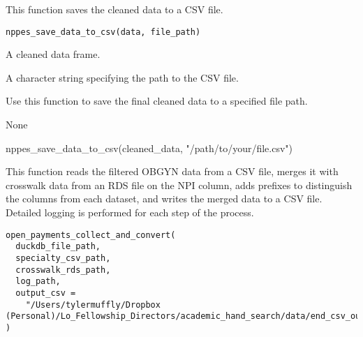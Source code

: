 \documentclass[a4paper]{book}
\begin{document}
%
\begin{Description}
This function saves the cleaned data to a CSV file.
\end{Description}
%
\begin{Usage}
\begin{verbatim}
nppes_save_data_to_csv(data, file_path)
\end{verbatim}
\end{Usage}
%
\begin{Arguments}
\begin{ldescription}
\item[\code{data}] A cleaned data frame.

\item[\code{file\_path}] A character string specifying the path to the CSV file.
\end{ldescription}
\end{Arguments}
%
\begin{Details}
Use this function to save the final cleaned data to a specified file path.
\end{Details}
%
\begin{Value}
None
\end{Value}
%
\begin{Examples}
\begin{ExampleCode}
nppes_save_data_to_csv(cleaned_data, "/path/to/your/file.csv")
\end{ExampleCode}
\end{Examples}
%
\begin{Description}
This function reads the filtered OBGYN data from a CSV file, merges it with crosswalk data from an RDS file on the NPI column, adds prefixes to distinguish the columns from each dataset, and writes the merged data to a CSV file. Detailed logging is performed for each step of the process.
\end{Description}
%
\begin{Usage}
\begin{verbatim}
open_payments_collect_and_convert(
  duckdb_file_path,
  specialty_csv_path,
  crosswalk_rds_path,
  log_path,
  output_csv =
    "/Users/tylermuffly/Dropbox (Personal)/Lo_Fellowship_Directors/academic_hand_search/data/end_csv_output_open_payments_collect_and_convert.csv"
)
\end{verbatim}
\end{Usage}
\end{document}
